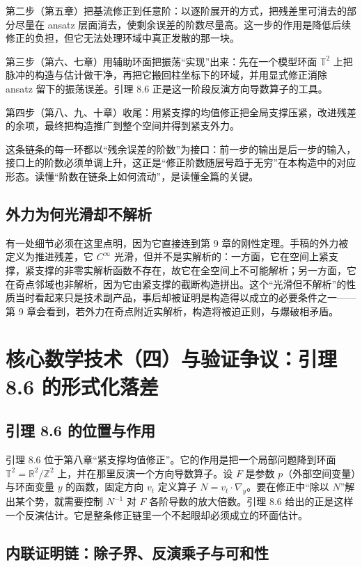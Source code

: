 第二步（第五章）把基流修正到任意阶：以逐阶展开的方式，把残差里可消去的部分尽量在 ansatz 层面消去，使剩余误差的阶数尽量高。这一步的作用是降低后续修正的负担，但它无法处理环域中真正发散的那一块。

第三步（第六、七章）用辅助环面把振荡“实现”出来：先在一个模型环面 $\mathbb{T}^{2}$ 上把脉冲的构造与估计做干净，再把它搬回柱坐标下的环域，并用显式修正消除 ansatz 留下的振荡误差。引理 8.6 正是这一阶段反演方向导数算子的工具。

第四步（第八、九、十章）收尾：用紧支撑的均值修正把全局支撑压紧，改进残差的余项，最终把构造推广到整个空间并得到紧支外力。

这条链条的每一环都以“残余误差的阶数”为接口：前一步的输出是后一步的输入，接口上的阶数必须单调上升，这正是“修正阶数随层号趋于无穷”在本构造中的对应形态。读懂“阶数在链条上如何流动”，是读懂全篇的关键。

\subsection{外力为何光滑却不解析}

有一处细节必须在这里点明，因为它直接连到第 9 章的刚性定理。手稿的外力被定义为推进残差，它 $C^{\infty}$ 光滑，但并不是实解析的：一方面，它在空间上紧支撑，紧支撑的非零实解析函数不存在，故它在全空间上不可能解析；另一方面，它在奇点邻域也非解析，因为它由紧支撑的截断构造拼出。这个“光滑但不解析”的性质当时看起来只是技术副产品，事后却被证明是构造得以成立的必要条件之一——第 9 章会看到，若外力在奇点附近实解析，构造将被迫正则，与爆破相矛盾。

\section{核心数学技术（四）与验证争议：引理 8.6 的形式化落差}

\subsection{引理 8.6 的位置与作用}

引理 8.6 位于第八章“紧支撑均值修正”。它的作用是把一个局部问题降到环面 $\mathbb{T}^{2}=\mathbb{R}^{2}/\mathbb{Z}^{2}$ 上，并在那里反演一个方向导数算子。设 $F$ 是参数 $p$（外部空间变量）与环面变量 $y$ 的函数，固定方向 $v_{t}$ 定义算子 $N=v_{t}\cdot\nabla_{y}$。要在修正中“除以 $N$”解出某个势，就需要控制 $N^{-1}$ 对 $F$ 各阶导数的放大倍数。引理 8.6 给出的正是这样一个反演估计。它是整条修正链里一个不起眼却必须成立的环面估计。

\subsection{内联证明链：除子界、反演乘子与可和性}

